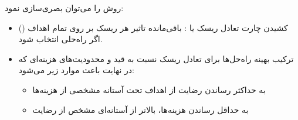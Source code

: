 روش  را می‌توان بصری‌سازی نمود:

\begin{itemize}
    \item کشیدن چارت تعادل ریسک یا : باقی‌مانده تاثیر هر
    ریسک بر روی تمام اهداف () اگر راه‌حلی  انتخاب شود.
    \item ترکیب بهینه راه‌حل‌ها برای تعادل ریسک نسبت به قید و محدودیت‌های
    هزینه‌ای که در نهایت باعث موارد زیر می‌شود: \begin{itemize} 
        \item به حداکثر رساندن رضایت از اهداف تحت آستانه مشخصی از هزینه‌ها
        \item به حداقل رساندن هزینه‌ها، بالاتر از آستانه‌ای مشخص از رضایت
    \end{itemize}
\end{itemize}